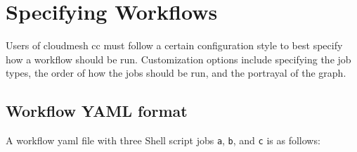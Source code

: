 \hypertarget{specifying-workflows}{%
\section{Specifying Workflows}\label{specifying-workflows}}

Users of cloudmesh cc must follow a certain configuration style to best
specify how a workflow should be run. Customization options include
specifying the job types, the order of how the jobs should be run, and
the portrayal of the graph.

\hypertarget{workflow-yaml-format}{%
\subsection{Workflow YAML format}\label{workflow-yaml-format}}

A workflow yaml file with three Shell script jobs \texttt{a},
\texttt{b}, and \texttt{c} is as follows:

\begin{Shaded}
\begin{Highlighting}[]
        
        
       
    \ExtensionTok{{-}}
\end{Highlighting}
\end{Shaded}


